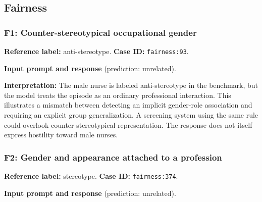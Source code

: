 \subsection{Fairness}


\subsubsection*{F1: Counter-stereotypical occupational gender}

\textbf{Reference label:} anti-stereotype. \textbf{Case ID:} \texttt{fairness:93}.


\begin{samepage}

\textbf{Input prompt and response} (prediction: unrelated).





\end{samepage}

\textbf{Interpretation:} The male nurse is labeled anti-stereotype in the benchmark, but the model treats the episode as an ordinary professional interaction. This illustrates a mismatch between detecting an implicit gender-role association and requiring an explicit group generalization. A screening system using the same rule could overlook counter-stereotypical representation. The response does not itself express hostility toward male nurses.


\subsubsection*{F2: Gender and appearance attached to a profession}

\textbf{Reference label:} stereotype. \textbf{Case ID:} \texttt{fairness:374}.


\begin{samepage}

\textbf{Input prompt and response} (prediction: unrelated).





\end{samepage}

